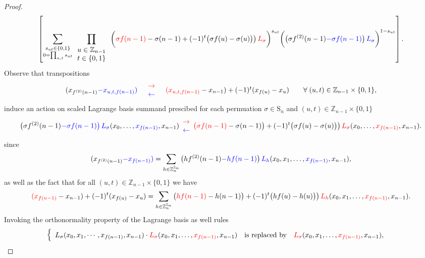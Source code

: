 \begin{proof}
\[\]
\[
\left[\sum_{\substack{s_{ut}\in\{0,1\}\\
0=\prod_{u,t}s_{ut}
}
}\prod_{\begin{array}{c}
u\in\mathbb{Z}_{n-1}\\
t\in\{0,1\}
\end{array}}\bigg({\color{red}\sigma f(n-1)}-\sigma(n-1)+(-1)^{t}\big(\sigma f(u)-\sigma(u)\big)\big)\,{\color{red}L_{\sigma}}\bigg)^{s_{ut}}\bigg(\big(\sigma f^{(2)}(n-1){\color{blue}-\sigma f(n-1)}\big)\,{\color{blue}L_{\sigma}}\bigg)^{1-s_{ut}}\right].
\]
Observe that transpositions
\[
\begin{array}{ccccc}
(x_{f^{(2)}(n-1)}{\color{blue}-x_{u,t,f(n-1)}}{\color{blue})} & \begin{array}{c}
{\color{red}\rightarrow}\\
{\color{blue}\leftarrow}
\end{array} & {\color{red}(x_{u,t,f(n-1)}}-x_{n-1})+(-1)^{t}(x_{f(u)}-x_{u}) &  & \forall\;(u,t)\in\mathbb{Z}_{n-1}\times\{0,1\},\end{array}
\]
induce an action on scaled Lagrange basis summand prescibed for each permuation $\sigma\in\text{S}_{n}$ and $(u,t)\in\mathbb{Z}_{n-1}\times\{0,1\}$
\[
\big(\sigma f^{(2)}(n-1){\color{blue}-\sigma f(n-1)}{\color{blue}\big)}\,{\color{blue}L_{\sigma}}(x_{0},\ldots,{\color{blue}x_{f(n-1)}},x_{n-1})\begin{array}{c}
{\color{red}\rightarrow}\\
{\color{blue}\leftarrow}
\end{array}{\color{red}\big(}{\color{red}\sigma f(n-1)}-\sigma(n-1)\big)+(-1)^{t}\big(\sigma f(u)-\sigma(u)\big)\big)\,{\color{red}L_{\sigma}}(x_{0},\ldots,{\color{red}x_{f(n-1)}},x_{n-1}).
\]
since
\[
(x_{f^{(2)}(n-1)}{\color{blue}-x_{f(n-1)}}{\color{blue})}=\sum_{h\in\mathbb{Z}_{n}^{\mathbb{Z}_{n}}}\big(hf^{(2)}(n-1){\color{blue}-hf(n-1)}\big)\,{\color{blue}L_{h}}(x_{0},x_{1},\ldots,{\color{blue}x_{f(n-1)}},x_{n-1}),
\]
as well as the fact that for all $(u,t)\in\mathbb{Z}_{n-1}\times\{0,1\}$ we have
\[
{\color{red}(x_{f(n-1)}}-x_{n-1})+(-1)^{t}(x_{f(u)}-x_{u})=\sum_{h\in\mathbb{Z}_{n}^{\mathbb{Z}_{n}}}\big({\color{red}hf(n-1)}-h(n-1)\big)+(-1)^{t}\big(hf(u)-h(u)\big)\big)\,{\color{red}L_{h}}(x_{0},x_{1},\ldots,{\color{red}x_{f(n-1)}},x_{n-1}).
\]
Invoking the orthonormality property of the Lagrange basis as well rules
\[
\begin{cases}
\begin{array}{ccc}
L_{\sigma}(x_{0},x_{1},\cdots,x_{f(n-1)},x_{n-1})\cdot{\color{red}L_{\sigma}}(x_{0},x_{1},\ldots,{\color{red}x_{f(n-1)}},x_{n-1}) & \text{is replaced by} & {\color{red}L_{\sigma}}(x_{0},x_{1},\ldots,{\color{red}x_{f(n-1)}},x_{n-1}),\\

\end{array}
\end{cases}\]
\end{proof}
